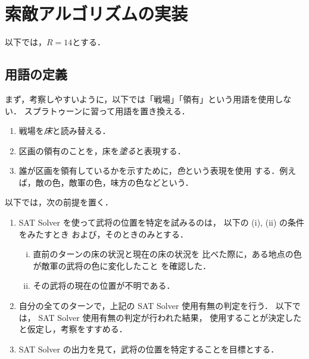 
\section{索敵アルゴリズムの実装}

以下では，$R = 14$とする．

\subsection{用語の定義}

まず，考察しやすいように，以下では「戦場」「領有」という用語を使用しない．
スプラトゥーンに習って用語を置き換える．

\begin{defn}
 \begin{enumerate}[1.]
  \item 戦場を\emph{床}と読み替える．
  \item 区画の領有のことを，床を\emph{塗る}と表現する．
  \item 誰が区画を領有しているかを示すために，\emph{色}という表現を使用
        する．例えば，敵の色，敵軍の色，味方の色などという．
 \end{enumerate}
\end{defn}

以下では，次の前提を置く．

\begin{rem}
 \begin{enumerate}[1.]
  \item SAT Solver を使って武将の位置を特定を試みるのは，
        以下の (i), (ii) の条件をみたすとき
        および，そのときのみとする．
        \begin{enumerate}[(i)]
         \item 直前のターンの床の状況と現在の床の状況を
               比べた際に，ある地点の色が敵軍の武将の色に変化したこと
               を確認した．
         \item その武将の現在の位置が不明である．
        \end{enumerate}  
  \item 自分の全てのターンで，上記の SAT Solver 使用有無の判定を行う．
        以下では， SAT Solver 使用有無の判定が行われた結果，
        使用することが決定したと仮定し，考察をすすめる．
  \item SAT Solver の出力を見て，武将の位置を特定することを目標とする．
 \end{enumerate}
\end{rem}

